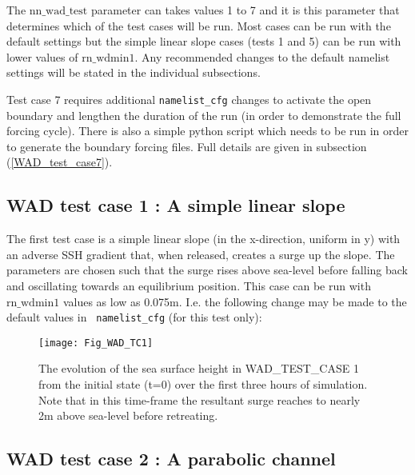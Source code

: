
The $\mathrm{nn\_wad\_test}$ parameter can takes values 1 to 7 and it is this parameter
that determines which of the test cases will be run. Most cases can be run with the
default settings but the simple linear slope cases (tests 1 and 5) can be run with lower
values of $\mathrm{rn\_wdmin1}$. Any recommended changes to the default namelist settings
will be stated in the individual subsections.

Test case 7 requires additional {\tt namelist\_cfg} changes to activate the open boundary
and lengthen the duration of the run (in order to demonstrate the full forcing cycle).
There is also a simple python script which needs to be run in order to generate the
boundary forcing files.  Full details are given in subsection (\ref{WAD_test_case7}).

\clearpage
\subsection [WAD test case 1 : A simple linear slope]
                    {WAD test case 1 : A simple linear slope}
\label{WAD_test_case1}

The first test case is a simple linear slope (in the x-direction, uniform in y) with an
adverse SSH gradient that, when released, creates a surge up the slope. The parameters are
chosen such that the surge rises above sea-level before falling back and oscillating
towards an equilibrium position. This case can be run with $\mathrm{rn\_wdmin1}$ values as
low as 0.075m. I.e. the following change may be made to the default values in {\tt
namelist\_cfg} (for this test only):


\begin{figure}[htb] \begin{center}
\texttt{[image: Fig\_WAD\_TC1]}
\caption{ \label{Fig_WAD_TC1}
The evolution of the sea surface height in WAD\_TEST\_CASE 1 from the initial state (t=0)
over the first three hours of simulation. Note that in this time-frame the resultant surge
reaches to nearly 2m above sea-level before retreating.}
\end{center}\end{figure}

\clearpage
\subsection [WAD test case 2 : A parabolic channel ]
                    {WAD test case 2 : A parabolic channel}
\label{WAD_test_case2}

